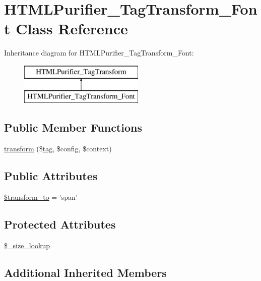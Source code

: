 \hypertarget{classHTMLPurifier__TagTransform__Font}{\section{H\+T\+M\+L\+Purifier\+\_\+\+Tag\+Transform\+\_\+\+Font Class Reference}
\label{classHTMLPurifier__TagTransform__Font}
}
Inheritance diagram for H\+T\+M\+L\+Purifier\+\_\+\+Tag\+Transform\+\_\+\+Font\+:\begin{figure}[H]
\begin{center}
\leavevmode
\includegraphics[height=2.000000cm]{classHTMLPurifier__TagTransform__Font}
\end{center}
\end{figure}
\subsection*{Public Member Functions}
\begin{DoxyCompactItemize}
\item 
\hyperlink{classHTMLPurifier__TagTransform__Font_ad58ea4dd1f47dbb43990ddbd83733e14}{transform} (\$\hyperlink{classtag}{tag}, \$config, \$context)
\end{DoxyCompactItemize}
\subsection*{Public Attributes}
\begin{DoxyCompactItemize}
\item 
\hyperlink{classHTMLPurifier__TagTransform__Font_ae7ea191975d1e5b5d1045620a8e78330}{\$transform\+\_\+to} = 'span'
\end{DoxyCompactItemize}
\subsection*{Protected Attributes}
\begin{DoxyCompactItemize}
\item 
\hyperlink{classHTMLPurifier__TagTransform__Font_ac2142e8ad00755138d88fbb40af3b86a}{\$\+\_\+size\+\_\+lookup}
\end{DoxyCompactItemize}
\subsection*{Additional Inherited Members}


